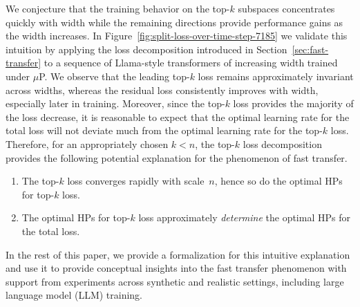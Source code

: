 \documentclass{article} %
\newcounter{idea}
\renewcommand{\theidea}{\arabic{idea}}
\begin{document}
We conjecture that the training behavior on the top-$k$ subspaces concentrates quickly with width while the remaining directions provide performance gains as the width increases. In Figure~\ref{fig:split-loss-over-time-step-7185} we validate this intuition by applying the loss decomposition introduced in Section~\ref{sec:fast-transfer} to a sequence of Llama-style transformers of increasing width trained under $\mu$P. We observe that the leading top-$k$ loss remains approximately invariant across widths, whereas the residual loss consistently improves with width, especially later in training. Moreover, since the top-$k$ loss provides the majority of the loss decrease, it is reasonable to expect that the optimal learning rate for the total loss will not deviate much from the optimal learning rate for the top-$k$ loss.  
Therefore, for an appropriately chosen $k < n$, the top-$k$ loss decomposition provides the following potential explanation for the phenomenon of fast transfer. 

\label{box:fast-transfer}
\begin{tcolorbox}[colback=white, colframe=gray,
  title={Hypothesis~\theidea: Fast Transfer via Loss Decomposition}]
\begin{enumerate}[leftmargin=1em,itemsep=0.2em]
    \item The top-$k$ loss converges rapidly with scale~$n$, hence so do the optimal HPs for top-$k$ loss.
    \item The optimal HPs for top-$k$ loss approximately \emph{determine} the optimal HPs for the total loss.
\end{enumerate}
\end{tcolorbox}
In the rest of this paper, we provide a formalization for this intuitive explanation and use it to provide conceptual insights into the fast transfer phenomenon with support from experiments across synthetic and realistic settings, including large language model (LLM) training.
\end{document}
